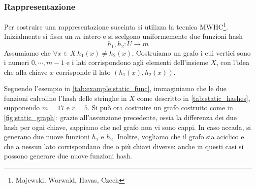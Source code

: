 \subsubsection{Rappresentazione}
Per costruire una rappresentazione succinta si utilizza la tecnica
MWHC\footnote{Majewski, Worwald, Havas, Czech}.
Inizialmente si fissa un $m$ intero e si scelgono uniformemente due funzioni hash
$$
	h_1, h_2 : U \rightarrow m
$$
Assumiamo che $\forall x \in X ~ h_1(x) \neq h_2(x)$.
Costruiamo un grafo i cui vertici sono i numeri $0, \cdots, m-1$ e i lati
corrispondono agli elementi dell'insieme $X$, con l'idea che alla chiave $x$
corrisponde il lato $(h_1(x), h_2(x))$.

Seguendo l'esempio in \cref{tab:example:static_func}, immaginiamo che
le due funzioni calcolino l'hash delle stringhe in $X$ come descritto
in \cref{tab:static_hashes}, supponendo $m = 17$ e $r = 5$. 
Si può ora costruire un grafo costruito
come in \cref{fig:static_graph}: grazie all'assunzione precedente,
ossia la differenza dei due hash per ogni chiave, sappiamo che nel
grafo non vi sono cappi. In caso accada, si generano due nuove
funzioni $h_1$ e $h_2$. Inoltre, vogliamo che il grafo sia
aciclico e che a nessun lato corrispondano due o più chiavi diverse: anche
in questi casi si possono generare due nuove funzioni hash.

